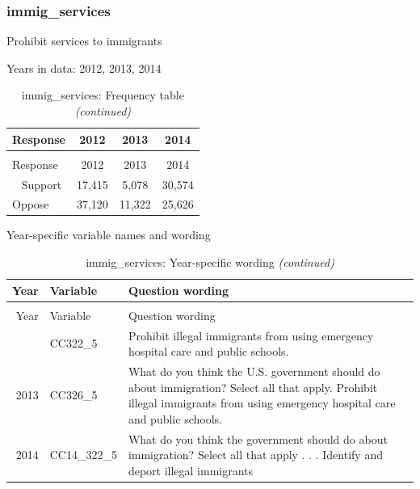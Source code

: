 \documentclass[12pt]{article}
\begin{document}
\subsubsection{immig\_services}\label{immig_services}

Prohibit services to immigrants

Years in data: 2012, 2013, 2014\begingroup\fontsize{10}{12}\selectfont

\begin{longtable}[t]{lccc}
\caption{\label{tab:unnamed-chunk-4}immig\_services: Frequency table}\\
\toprule
Response & 2012 & 2013 & 2014\\
\midrule
\endfirsthead
\caption[]{immig\_services: Frequency table \textit{(continued)}}\\
\toprule
Response & 2012 & 2013 & 2014\\
\midrule
\endhead
\
\endfoot
\bottomrule
\endlastfoot
Support & 17,415 & 5,078 & 30,574\\
Oppose & 37,120 & 11,322 & 25,626\\*
\end{longtable}

\endgroup{}

Year-specific variable names and wording

\begin{longtable}[t]{rl>{\raggedright\arraybackslash}p{10cm}}
\caption{\label{tab:unnamed-chunk-4}immig\_services: Year-specific wording}\\
\toprule
Year & Variable & Question wording\\
\midrule
\endfirsthead
\caption[]{immig\_services: Year-specific wording \textit{(continued)}}\\
\toprule
Year & Variable & Question wording\\
\midrule
\endhead
\
\endfoot
\bottomrule
\endlastfoot
2012 & CC322\_5 & Prohibit illegal immigrants from using emergency hospital care and public schools.\\
2013 & CC326\_5 & What do you think the U.S. government should do about immigration? Select all that apply. Prohibit illegal immigrants from using emergency hospital care and public schools.\\
2014 & CC14\_322\_5 & What do you think the government should do about immigration? Select all that apply . . . Identify and deport illegal immigrants\\*
\end{longtable}\newpage
\end{document}

